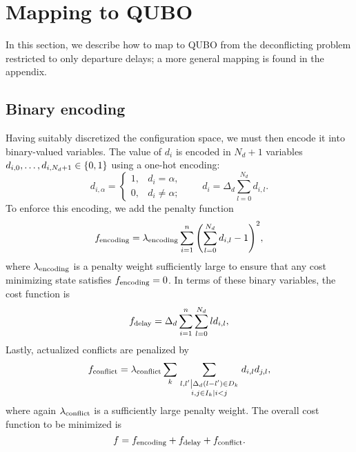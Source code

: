 \section{Mapping to QUBO}
In this section, we describe how to map to QUBO from the deconflicting problem restricted to only departure delays; a more general mapping is found in the appendix.

\subsection{Binary encoding}
Having suitably discretized the configuration space, we must then encode it into binary-valued variables.
The value of $d_i$ is encoded in $N_d + 1$ variables $d_{i,0}, \ldots, d_{i,N_d + 1} \in {\{0, 1\}}$ using a one-hot encoding:
\begin{equation}
d_{i, \alpha} = \begin{cases}
1, & d_i = \alpha,\\
0, & d_i \neq \alpha;
\end{cases}
\qquad
d_i = \Delta_d \sum_{l = 0}^{N_d} d_{i,l}.
\end{equation}
To enforce this encoding, we add the penalty function
\begin{equation}
\label{eq:dep-delay-encoding-penalty}
f_{\mathrm{encoding}} = 
\lambda_{\mathrm{encoding}} 
\sum_{i = 1}^n 
{\left(
\sum_{l = 0}^{N_d} d_{i,l} - 1
\right)}^2,
\end{equation}
where $\lambda_{\mathrm{encoding}}$ is a penalty weight sufficiently large to ensure that any cost minimizing state satisfies $f_{\mathrm{encoding}} = 0$.
In terms of these binary variables, the cost function is 
\begin{equation}
f_{\mathrm{delay}} = 
\Delta_d
\sum_{i=1}^n 
\sum_{l=0}^{N_d} l d_{i,l},
\end{equation}
Lastly, actualized conflicts are penalized by 
\begin{equation}
  f_{\mathrm{conflict}}
=
\lambda_{\mathrm{conflict}}
\sum_{k}
\sum_{\substack{\left.l, l' \middle| \Delta_d (l - l') \in D_k\right.\\
\left. i, j \in I_k \middle| i < j \right.}}
  d_{i,l} d_{j, l},
\end{equation}
where again $\lambda_{\mathrm{conflict}}$ is a sufficiently large penalty weight. 
The overall cost function to be minimized is 
\begin{equation}
f
=
f_{\mathrm{encoding}} + f_{\mathrm{delay}} + f_{\mathrm{conflict}}.
\end{equation}



